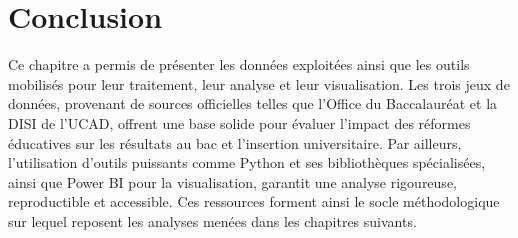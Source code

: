\section{Conclusion}

Ce chapitre a permis de présenter les données exploitées ainsi que les outils mobilisés pour leur traitement, leur analyse et leur visualisation. 
Les trois jeux de données, provenant de sources officielles telles que l’Office du Baccalauréat et la DISI de l’UCAD, 
offrent une base solide pour évaluer l’impact des réformes éducatives sur les résultats au bac et l’insertion universitaire. 
Par ailleurs, l’utilisation d’outils puissants comme Python et ses bibliothèques spécialisées, ainsi que Power BI pour la visualisation, 
garantit une analyse rigoureuse, reproductible et accessible. Ces ressources forment ainsi le socle méthodologique sur lequel reposent les analyses menées dans les chapitres suivants.